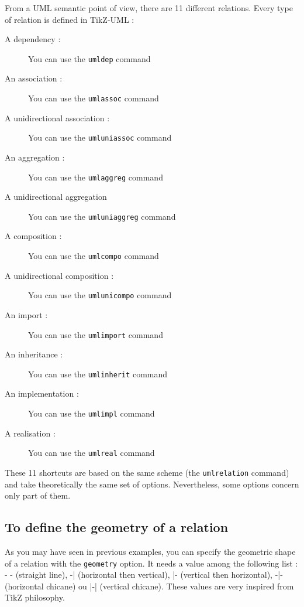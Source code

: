 \documentclass[a4paper,11pt]{report}
\newcommand{\inputTikZ}[1]{%
  }%
\newcommand{\inputTikZ}[1]{%
    \texttt{[image: fig/\#1.pdf]}%
  }%
\newcommand{\tuml}{{\sc TikZ-UML} \xspace}
\newcommand{\TikZ}{{\sc TikZ} \xspace}
\begin{document}
\medskip

\begin{minipage}{0.5\textwidth}

\end{minipage}
\begin{minipage}{0.4\textwidth}
\begin{center}
\inputTikZ{relation}
\end{center}
\end{minipage}

From a UML semantic point of view, there are 11 different relations. Every type of relation is defined in \tuml :

\begin{description}
\item[A dependency :] You can use the {\tt umldep} command
\item[An association :] You can use the {\tt umlassoc} command
\item[A unidirectional association :] You can use the {\tt umluniassoc} command
\item[An aggregation :] You can use the {\tt umlaggreg} command
\item[A unidirectional aggregation ] You can use the {\tt umluniaggreg} command
\item[A composition :] You can use the {\tt umlcompo} command
\item[A unidirectional composition :] You can use the {\tt umlunicompo} command
\item[An import :] You can use the {\tt umlimport} command
\item[An inheritance :] You can use the {\tt umlinherit} command
\item[An implementation :] You can use the {\tt umlimpl} command
\item[A realisation :] You can use the {\tt umlreal} command
\end{description}

These 11 shortcuts are based on the same scheme (the {\tt umlrelation} command) and take theoretically the same set of options. Nevertheless, some options concern only part of them.

\subsection{To define the geometry of a relation}\label{ss.relgeom}

As you may have seen in previous examples, you can specify the geometric shape of a relation
with the \hypertarget{geometry}{{\tt geometry}} option. It needs a value among the following list : - - (straight line), -| (horizontal then vertical), |- (vertical then horizontal), -|- (horizontal chicane) ou |-| (vertical chicane). These values are very inspired from \TikZ philosophy.
\end{document}
